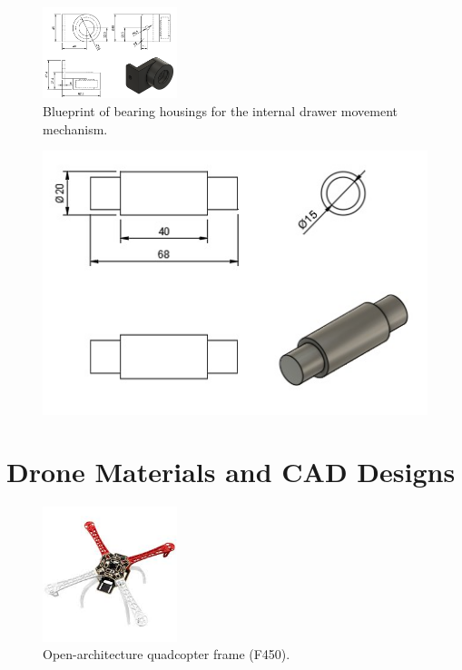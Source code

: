 \begin{figure}[H]
    \centering
    \includegraphics[width=0.35\textwidth]{PLANOS/PLANO_CHUMACERA.png}
    \caption{Blueprint of bearing housings for the internal drawer movement mechanism.}
    \label{fig:mecanismo_chumacera}
\end{figure}

\begin{figure}[H]
    \centering
    \includegraphics{pictures/PLANO_FLECHA.jpeg}
    \caption{}
    \label{fig:flecha}
\end{figure}





\section{Drone Materials and CAD Designs}

\begin{figure}[H]
    \centering
    \includegraphics[width=0.35\textwidth]{pictures/f450.jpeg}
    \caption{Open-architecture quadcopter frame (F450).}
    \label{fig:f450_frame}
\end{figure}

